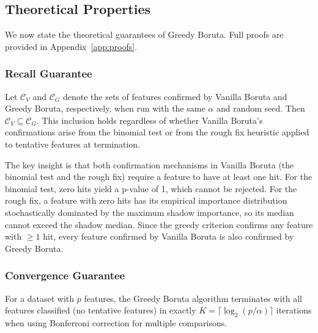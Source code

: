 \documentclass[runningheads]{llncs}
\begin{document}

\subsection{Theoretical Properties}
\label{sec:method:theory}

We now state the theoretical guarantees of Greedy Boruta. Full proofs are provided in Appendix~\ref{app:proofs}.

\subsubsection{Recall Guarantee}

\begin{theorem}
\label{thm:recall}
Let $\mathcal{C}_V$ and $\mathcal{C}_G$ denote the sets of features confirmed by Vanilla Boruta and Greedy Boruta, respectively, when run with the same $\alpha$ and random seed. Then $\mathcal{C}_V \subseteq \mathcal{C}_G$. This inclusion holds regardless of whether Vanilla Boruta's confirmations arise from the binomial test or from the rough fix heuristic applied to tentative features at termination.
\end{theorem}

The key insight is that both confirmation mechanisms in Vanilla Boruta (the binomial test and the rough fix) require a feature to have at least one hit. For the binomial test, zero hits yield a p-value of 1, which cannot be rejected. For the rough fix, a feature with zero hits has its empirical importance distribution stochastically dominated by the maximum shadow importance, so its median cannot exceed the shadow median. Since the greedy criterion confirms any feature with $\geq 1$ hit, every feature confirmed by Vanilla Boruta is also confirmed by Greedy Boruta.

\subsubsection{Convergence Guarantee}

\begin{theorem}
\label{thm:convergence}
For a dataset with $p$ features, the Greedy Boruta algorithm terminates with all features classified (no tentative features) in exactly $K = \lceil \log_2(p/\alpha) \rceil$ iterations when using Bonferroni correction for multiple comparisons.
\end{theorem}
\end{document}
